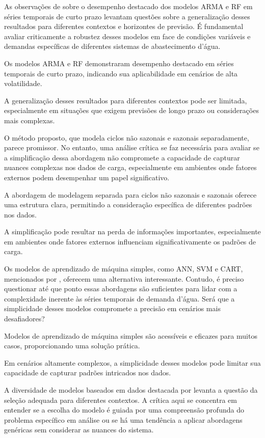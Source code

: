 As observações de  sobre o desempenho destacado dos modelos ARMA e RF em séries temporais de curto prazo levantam questões sobre a generalização desses resultados para diferentes contextos e horizontes de previsão. É fundamental avaliar criticamente a robustez desses modelos em face de condições variáveis e demandas específicas de diferentes sistemas de abastecimento d'água.

Os modelos ARMA e RF demonstraram desempenho destacado em séries temporais de curto prazo, indicando sua aplicabilidade em cenários de alta volatilidade.

A generalização desses resultados para diferentes contextos pode ser limitada, especialmente em situações que exigem previsões de longo prazo ou considerações mais complexas.

O método proposto, que modela ciclos não sazonais e sazonais separadamente, parece promissor. No entanto, uma análise crítica se faz necessária para avaliar se a simplificação dessa abordagem não compromete a capacidade de capturar nuances complexas nos dados de carga, especialmente em ambientes onde fatores externos podem desempenhar um papel significativo.

A abordagem de modelagem separada para ciclos não sazonais e sazonais oferece uma estrutura clara, permitindo a consideração específica de diferentes padrões nos dados.

A simplificação pode resultar na perda de informações importantes, especialmente em ambientes onde fatores externos influenciam significativamente os padrões de carga.

Os modelos de aprendizado de máquina simples, como ANN, SVM e CART, mencionados por , oferecem uma alternativa interessante. Contudo, é preciso questionar até que ponto essas abordagens são suficientes para lidar com a complexidade inerente às séries temporais de demanda d'água. Será que a simplicidade desses modelos compromete a precisão em cenários mais desafiadores?

Modelos de aprendizado de máquina simples são acessíveis e eficazes para muitos casos, proporcionando uma solução prática.

Em cenários altamente complexos, a simplicidade desses modelos pode limitar sua capacidade de capturar padrões intricados nos dados.

A diversidade de modelos baseados em dados destacada por  levanta a questão da seleção adequada para diferentes contextos. A crítica aqui se concentra em entender se a escolha do modelo é guiada por uma compreensão profunda do problema específico em análise ou se há uma tendência a aplicar abordagens genéricas sem considerar as nuances do sistema.

